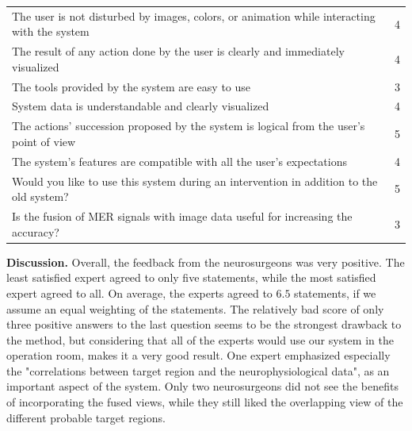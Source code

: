 \documentclass{vgtc}                          %
\begin{document}

\noindent \begin{tabular}{p{} c}
\hline
The user is not disturbed by images, colors, or animation while interacting with the system	& 4\\
The result of any action done by the user is clearly and immediately visualized				& 4\\
The tools provided by the system are easy to use												& 3\\
System data is understandable and clearly visualized											& 4\\
The actions' succession proposed by the system is logical from the user's point of view		& 5\\
The system's features are compatible with all the user's expectations							& 4\\
Would you like to use this system during an intervention in addition to the old system?		& 5\\
Is the fusion of MER signals with image data useful for increasing the accuracy?				& 3\\
\hline
\end{tabular}

\noindent \textbf{Discussion.} Overall, the feedback from the neurosurgeons was very positive. The least satisfied expert agreed to only five statements, while the most satisfied expert agreed to all. On average, the experts agreed to $6.5$ statements, if we assume an equal weighting of the statements. The relatively bad score of only three positive answers to the last question seems to be the strongest drawback to the method, but considering that all of the experts would use our system in the operation room, makes it a very good result. One expert emphasized especially the "correlations between target region and the neurophysiological data", as an important aspect of the system. Only two neurosurgeons did not see the benefits of incorporating the fused views, while they still liked the overlapping view of the different probable target regions.
\end{document}

